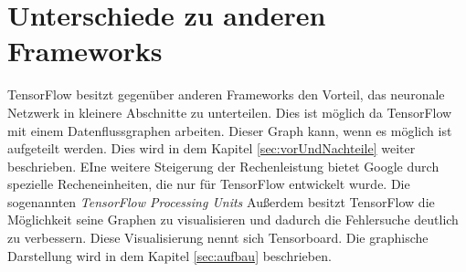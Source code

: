 \section{Unterschiede zu anderen Frameworks}
\label{sec:unterschiede}
TensorFlow besitzt gegenüber anderen Frameworks den Vorteil, das neuronale Netzwerk in kleinere Abschnitte zu unterteilen. Dies ist möglich da TensorFlow mit einem Datenflussgraphen arbeiten. Dieser Graph kann, wenn es möglich ist aufgeteilt werden. Dies wird in dem Kapitel \ref{sec:vorUndNachteile} weiter beschrieben. EIne weitere Steigerung der Rechenleistung bietet Google durch spezielle Recheneinheiten, die nur für TensorFlow entwickelt wurde. Die sogenannten \textit{TensorFlow Processing Units} Außerdem besitzt TensorFlow die Möglichkeit seine Graphen zu visualisieren und dadurch die Fehlersuche deutlich zu verbessern. Diese Visualisierung nennt sich Tensorboard. Die graphische Darstellung wird in dem Kapitel \ref{sec:aufbau} beschrieben.
